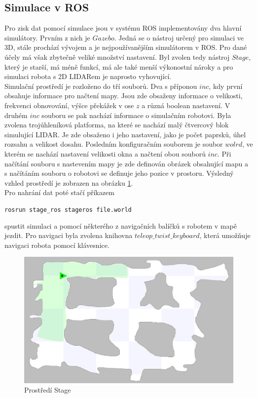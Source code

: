 \documentclass[12pt]{report}
\begin{document}
\subsection{Simulace v ROS}
Pro zisk dat pomocí simulace jsou v systému ROS implementovány dva hlavní simulátory. Prvním z nich je $Gazebo$. Jedná se o nástroj určený pro simulaci ve 3D, stále prochází vývojem a je nejpoužívanějším simulátorem v ROS. Pro dané účely má však zbytečně veliké množství nastavení. Byl zvolen tedy nástroj $Stage$, který je starší, má méně funkcí, má ale také menší výkonostní nároky a pro simulaci robota s 2D LIDARem je naprosto vyhovující.\\
\indent Simulační prostředí je rozloženo do tří souborů. Dva s příponou $inc$, kdy první obsahuje informace pro načtení mapy. Jsou zde obsaženy informace o velikosti, frekvenci obnovování, výšce překážek v ose $z$ a různá boolean nastavení. V druhém $inc$ souboru se pak nachází informace o simulačním robotovi. Byla zvolena trojúhleníková platforma, na které se nachází malý čtvercový blok simulující LIDAR. Je zde obsaženo i jeho nastavení, jako je počet paprsků, úhel rozsahu a velikost dosahu. Posledním konfiguračním souborem je soubor $wolrd$, ve kterém se nachází nastavení velikosti okna a načtení obou souborů $inc$. Při načítání souboru s nastevením mapy je zde definován obrázek obsahující mapu a s načítáním souboru o robotovi se definuje jeho pozice v prostoru. Výsledný vzhled prostředí je zobrazen na obrázku \ref{fig:stage}.\\
Pro nahrání dat poté stačí příkazem
\begin{center}
	\texttt{rosrun stage\_ros stageros file.world}
\end{center}
spustit simulaci a pomocí některého z navigačních balíčků s robotem v mapě jezdit. Pro navigaci byla zvolena knihovna $teleop\_twist\_keyboard$, která umožňuje navigaci robota pomocí klávesnice. 

\begin{figure}[!ht]
	\begin{center}
		\includegraphics[width=0.7\columnwidth]{imgs/stage.png}
	\end{center}
	\caption{Prostředí Stage}
	\label{fig:stage}
\end{figure}
\end{document}
